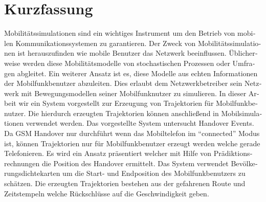 \documentclass[master,english]{hgbthesis}
\begin{document}
% 
\chapter{Kurzfassung}
\begin{german}
Mobilitätssimulationen sind ein wichtiges Instrument um den Betrieb von mobilen Kommunikationssystemen zu garantieren. Der Zweck von Mobilitätssimulationen ist herauszufinden wie mobile Benutzer das Netzwerk beeinflussen. Üblicherweise werden diese Mobilitätsmodelle von stochastischen Prozessen oder Umfragen abgleitet. Ein weiterer Ansatz ist es, diese Modelle aus echten Informationen der Mobilfunkbenutzer abzuleiten. Dies erlaubt dem Netzwerkbetreiber sein Netzwerk mit Bewegungsmodellen seiner Mobilfunknutzer zu simulieren.
In dieser Arbeit wir ein System vorgestellt zur Erzeugung von Trajektorien für Mobilfunkbenutzer. Die hierdurch erzeugten Trajektorien können anschließend in Mobilsimulationen verwendet werden. Das vorgestellte System untersucht Handover Events. Da GSM Handover nur durchführt wenn das Mobiltelefon im "`connected"' Modus ist, können Trajektorien nur für Mobilfunkbenutzer erzeugt werden welche gerade Telefonieren. Es wird ein Ansatz präsentiert welcher mit Hilfe von Prädiktionsrechnungen die Position des Handover ermittelt. Das System verwendet Bevölkerungsdichtekarten um die Start- und Endposition des Mobilfunkbenutzers zu schätzen. Die erzeugten Trajektorien bestehen aus der gefahrenen Route und Zeitstempeln welche Rückschlüsse auf die Geschwindigkeit geben.
\end{german}%
\end{document}
